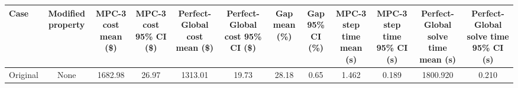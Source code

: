 \begin{tabular}{lccccccccccc}
\toprule
Case & Modified property & MPC-3 cost mean (\$) & MPC-3 cost 95\% CI (\$) & Perfect-Global cost mean (\$) & Perfect-Global cost 95\% CI (\$) & Gap mean (\%) & Gap 95\% CI (\%) & MPC-3 step time mean (s) & MPC-3 step time 95\% CI (s) & Perfect-Global solve time mean (s) & Perfect-Global solve time 95\% CI (s) \\
\midrule
Original & None & 1682.98 & 26.97 & 1313.01 & 19.73 & 28.18 & 0.65 & 1.462 & 0.189 & 1800.920 & 0.210 \\
\bottomrule
\end{tabular}
